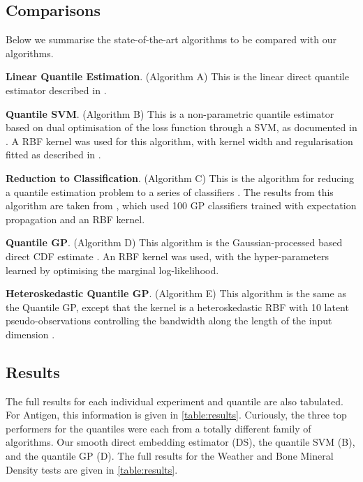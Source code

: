 \documentclass[twoside]{article} \usepackage{aistats2017}
\theoremstyle{definition}
\theoremstyle{theorem}
\begin{document}
	\subsection{Comparisons}
	\label{sec:experiments:comparison}
	
	Below we summarise the state-of-the-art algorithms to be compared with our algorithms.
	
	\textbf{Linear Quantile Estimation}. (Algorithm A) This is the linear direct quantile estimator described in \cite{koenker1978regression}.
	
	\textbf{Quantile SVM}. (Algorithm B) This is a non-parametric quantile estimator based on dual optimisation of the loss function through a SVM, as documented in \cite{takeuchi2006nonparametric}. A RBF kernel was used for this algorithm, with kernel width and regularisation fitted as described in \cite{quadrianto2009kernel}.
	
	\textbf{Reduction to Classification}. (Algorithm C) This is the algorithm for reducing a quantile estimation problem to a series of classifiers \citep{langford2012predicting}. The results from this algorithm are taken from \cite{quadrianto2009kernel}, which used 100 GP classifiers trained with expectation propagation and an RBF kernel.
	
	\textbf{Quantile GP}. (Algorithm D) This algorithm is the Gaussian-processed based direct CDF estimate \cite{quadrianto2009kernel}. An RBF kernel was used, with the hyper-parameters learned by optimising the marginal log-likelihood.
	
	\textbf{Heteroskedastic Quantile GP}. (Algorithm E) This algorithm is the same as the Quantile GP, except that the kernel is a heteroskedastic RBF with 10 latent pseudo-observations controlling the bandwidth along the length of the input dimension \citep{quadrianto2009kernel}. 
		
	\subsection{Results}
	\label{sec:experiments:results}
	
		The full results for each individual experiment and quantile are also tabulated. For Antigen, this information is given in \cref{table:results}. Curiously, the three top performers for the quantiles were each from a totally different family of algorithms. Our smooth direct embedding estimator (DS), the quantile SVM (B), and the quantile GP (D). The full results for the Weather and Bone Mineral Density tests are given in \cref{table:results}.
		
\end{document}
